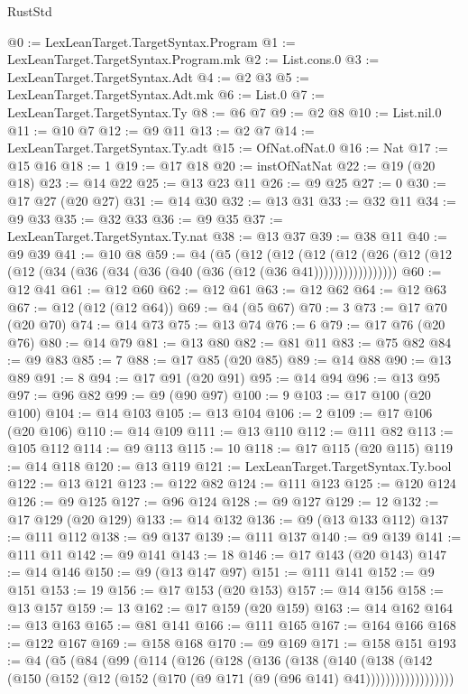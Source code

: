 \begin{lexlean}{RustStd}
\begin{coremodule}
@0 := LexLeanTarget.TargetSyntax.Program
@1 := LexLeanTarget.TargetSyntax.Program.mk
@2 := List.cons.{0}
@3 := LexLeanTarget.TargetSyntax.Adt
@4 := @2 @3
@5 := LexLeanTarget.TargetSyntax.Adt.mk
@6 := List.{0}
@7 := LexLeanTarget.TargetSyntax.Ty
@8 := @6 @7
@9 := @2 @8
@10 := List.nil.{0}
@11 := @10 @7
@12 := @9 @11
@13 := @2 @7
@14 := LexLeanTarget.TargetSyntax.Ty.adt
@15 := OfNat.ofNat.{0}
@16 := Nat
@17 := @15 @16
@18 := 1
@19 := @17 @18
@20 := instOfNatNat
@22 := @19 (@20 @18)
@23 := @14 @22
@25 := @13 @23 @11
@26 := @9 @25
@27 := 0
@30 := @17 @27 (@20 @27)
@31 := @14 @30
@32 := @13 @31
@33 := @32 @11
@34 := @9 @33
@35 := @32 @33
@36 := @9 @35
@37 := LexLeanTarget.TargetSyntax.Ty.nat
@38 := @13 @37
@39 := @38 @11
@40 := @9 @39
@41 := @10 @8
@59 := @4
    (@5
      (@12
        (@12
          (@12 (@12 (@26 (@12 (@12 (@12 (@34 (@36 (@34 (@36 (@40 (@36 (@12 (@36 @41)))))))))))))))))
@60 := @12 @41
@61 := @12 @60
@62 := @12 @61
@63 := @12 @62
@64 := @12 @63
@67 := @12 (@12 (@12 @64))
@69 := @4 (@5 @67)
@70 := 3
@73 := @17 @70 (@20 @70)
@74 := @14 @73
@75 := @13 @74
@76 := 6
@79 := @17 @76 (@20 @76)
@80 := @14 @79
@81 := @13 @80
@82 := @81 @11
@83 := @75 @82
@84 := @9 @83
@85 := 7
@88 := @17 @85 (@20 @85)
@89 := @14 @88
@90 := @13 @89
@91 := 8
@94 := @17 @91 (@20 @91)
@95 := @14 @94
@96 := @13 @95
@97 := @96 @82
@99 := @9 (@90 @97)
@100 := 9
@103 := @17 @100 (@20 @100)
@104 := @14 @103
@105 := @13 @104
@106 := 2
@109 := @17 @106 (@20 @106)
@110 := @14 @109
@111 := @13 @110
@112 := @111 @82
@113 := @105 @112
@114 := @9 @113
@115 := 10
@118 := @17 @115 (@20 @115)
@119 := @14 @118
@120 := @13 @119
@121 := LexLeanTarget.TargetSyntax.Ty.bool
@122 := @13 @121
@123 := @122 @82
@124 := @111 @123
@125 := @120 @124
@126 := @9 @125
@127 := @96 @124
@128 := @9 @127
@129 := 12
@132 := @17 @129 (@20 @129)
@133 := @14 @132
@136 := @9 (@13 @133 @112)
@137 := @111 @112
@138 := @9 @137
@139 := @111 @137
@140 := @9 @139
@141 := @111 @11
@142 := @9 @141
@143 := 18
@146 := @17 @143 (@20 @143)
@147 := @14 @146
@150 := @9 (@13 @147 @97)
@151 := @111 @141
@152 := @9 @151
@153 := 19
@156 := @17 @153 (@20 @153)
@157 := @14 @156
@158 := @13 @157
@159 := 13
@162 := @17 @159 (@20 @159)
@163 := @14 @162
@164 := @13 @163
@165 := @81 @141
@166 := @111 @165
@167 := @164 @166
@168 := @122 @167
@169 := @158 @168
@170 := @9 @169
@171 := @158 @151
@193 := @4
    (@5
      (@84
        (@99
          (@114
            (@126
              (@128
                (@136
                  (@138
                    (@140
                      (@138
                        (@142
                          (@150 (@152 (@12 (@152 (@170 (@9 @171 (@9 (@96 @141) @41))))))))))))))))))

\end{coremodule}
\end{lexlean}
